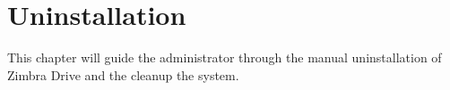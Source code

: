 \chapter{Uninstallation}
This chapter will guide the administrator through the manual uninstallation of Zimbra Drive and
the cleanup the system.



